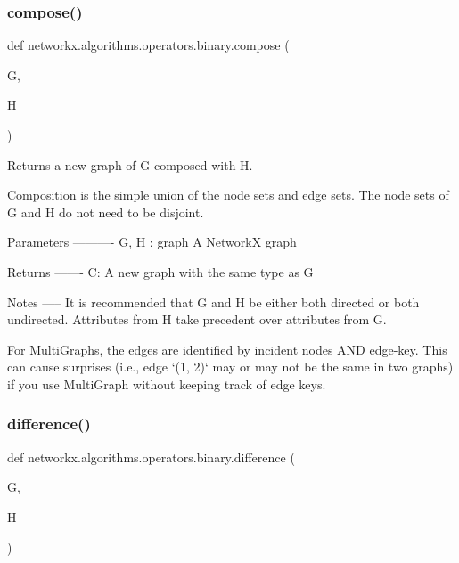 \subsubsection{\texorpdfstring{compose()}{compose()}}
{\footnotesize\ttfamily def networkx.\+algorithms.\+operators.\+binary.\+compose (\begin{DoxyParamCaption}\item[{}]{G,  }\item[{}]{H }\end{DoxyParamCaption})}

\begin{DoxyVerb}Returns a new graph of G composed with H.

Composition is the simple union of the node sets and edge sets.
The node sets of G and H do not need to be disjoint.

Parameters
----------
G, H : graph
   A NetworkX graph

Returns
-------
C: A new graph  with the same type as G

Notes
-----
It is recommended that G and H be either both directed or both undirected.
Attributes from H take precedent over attributes from G.

For MultiGraphs, the edges are identified by incident nodes AND edge-key.
This can cause surprises (i.e., edge `(1, 2)` may or may not be the same
in two graphs) if you use MultiGraph without keeping track of edge keys.
\end{DoxyVerb}
 \mbox{\label{namespacenetworkx_1_1algorithms_1_1operators_1_1binary_a7f1344a1a58fd6b4c9b548ec21696106}} 
\subsubsection{\texorpdfstring{difference()}{difference()}}
{\footnotesize\ttfamily def networkx.\+algorithms.\+operators.\+binary.\+difference (\begin{DoxyParamCaption}\item[{}]{G,  }\item[{}]{H }\end{DoxyParamCaption})}

